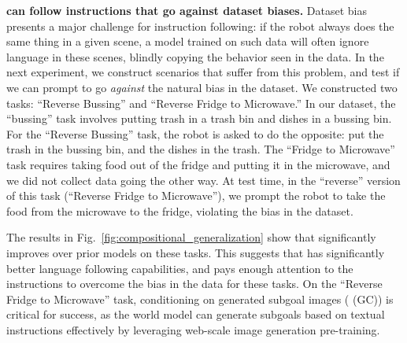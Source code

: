 \noindent \textbf{\MethodName{} can follow instructions that go against dataset biases. }
Dataset bias presents a major challenge for instruction following: if the robot always does the same thing in a given scene, a model trained on such data will often ignore language in these scenes, blindly copying the behavior seen in the data. In the next experiment, we construct scenarios that suffer from this problem, and test if we can prompt \MethodName{} to go \emph{against} the natural bias in the dataset.
We constructed two tasks: ``Reverse Bussing'' and ``Reverse Fridge to Microwave.'' In our dataset, the ``bussing'' task involves putting trash in a trash bin and dishes in a bussing bin. For the ``Reverse Bussing'' task, the robot is asked to do the opposite: put the trash in the bussing bin, and the dishes in the trash. The ``Fridge to Microwave'' task requires taking food out of the fridge and putting it in the microwave, and we did not collect data going the other way. At test time, in the ``reverse'' version of this task (``Reverse Fridge to Microwave''), we prompt the robot to take the food from the microwave to the fridge, violating the bias in the dataset.

The results in Fig.~\ref{fig:compositional_generalization} show that \MethodName{} significantly improves over prior models on these tasks. This suggests that \MethodName{} has significantly better language following capabilities, and pays enough attention to the instructions to overcome the bias in the data for these tasks. On the ``Reverse Fridge to Microwave'' task, conditioning on generated subgoal images (\MethodName{} (GC)) is critical for success, as the world model can generate subgoals based on textual instructions effectively by leveraging web-scale image generation pre-training.


